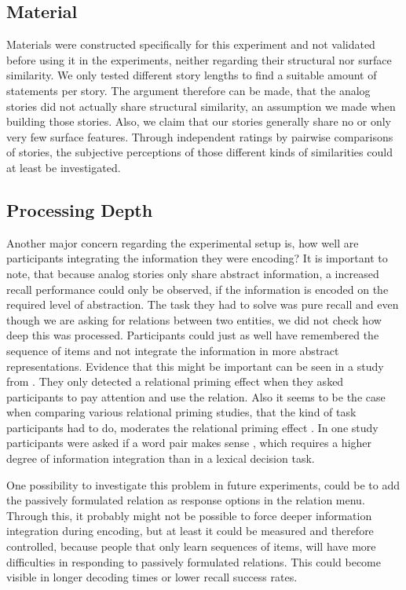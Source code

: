 \documentclass[a4paper,man,natbib,floatsintext,import]{apa6}
\begin{document}
\subsection{Material}
Materials were constructed specifically for this experiment and not validated before using it in the experiments, neither regarding their structural nor surface similarity. We only tested different story lengths to find a suitable amount of statements per story. The argument therefore can be made, that the analog stories did not actually share structural similarity, an assumption we made when building those stories. Also, we claim that our stories generally share no or only very few surface features. Through independent ratings by pairwise comparisons of stories, the subjective perceptions of those different kinds of similarities could at least be investigated.

\subsection{Processing Depth}
Another major concern regarding the experimental setup is, how well are participants integrating the information they were encoding? It is important to note, that because analog stories only share abstract information, a increased recall performance could only be observed, if the information is encoded on the required level of abstraction. The task they had to solve was pure recall and even though we are asking for relations between two entities, we did not check how deep this was processed. Participants could just as well have remembered the sequence of items and not integrate the information in more abstract representations. Evidence that this might be important can be seen in a study from \cite{Spellman2001}. They only detected a relational priming effect when they asked participants to pay attention and use the relation. Also it seems to be the case when comparing various relational priming studies, that the kind of task participants had to do, moderates the relational priming effect \citep{Popov2015}. In one study participants were asked if a word pair makes sense \citep{Estes2006}, which requires a higher degree of information integration than in a lexical decision task.

One possibility to investigate this problem in future experiments, could be to add the passively formulated relation as response options in the relation menu. Through this, it probably might not be possible to force deeper information integration during encoding, but at least it could be measured and therefore controlled, because people that only learn sequences of items, will have more difficulties in responding to passively formulated relations. This could become visible in longer decoding times or lower recall success rates.
\end{document}

